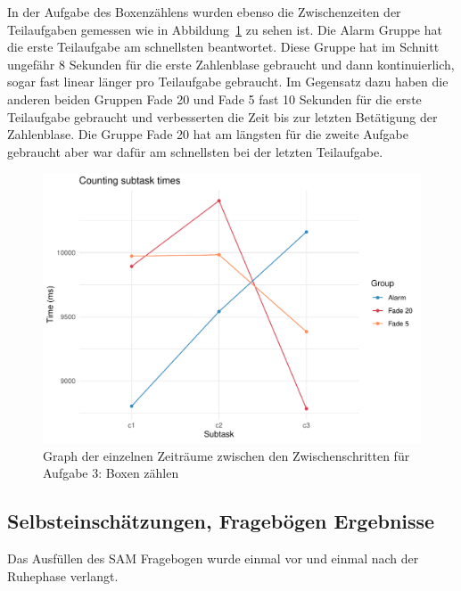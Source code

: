 In der Aufgabe des Boxenzählens wurden ebenso die Zwischenzeiten der Teilaufgaben gemessen wie in Abbildung~\ref{fig:timeTask3} zu sehen ist. Die Alarm Gruppe hat die erste Teilaufgabe am schnellsten beantwortet. Diese Gruppe hat im Schnitt ungefähr  8 Sekunden für die erste Zahlenblase gebraucht und dann kontinuierlich, sogar fast linear länger pro Teilaufgabe gebraucht. Im Gegensatz dazu haben die anderen beiden Gruppen Fade 20 und Fade 5 fast 10 Sekunden für die erste Teilaufgabe gebraucht und verbesserten die Zeit bis zur letzten Betätigung der Zahlenblase. Die Gruppe Fade 20 hat am längsten für die zweite Aufgabe gebraucht aber war dafür am schnellsten bei der letzten Teilaufgabe.

\begin{figure}[H]
	\centering
	\includegraphics[width=\textwidth]{./_StudyResults/timeTask3}
	\caption{Graph der einzelnen Zeiträume zwischen den Zwischenschritten für Aufgabe 3: Boxen zählen}
	\label{fig:timeTask3}
\end{figure}


\subsection{Selbsteinschätzungen, Fragebögen Ergebnisse}

Das Ausfüllen des SAM Fragebogen wurde einmal vor und einmal nach der Ruhephase verlangt.


